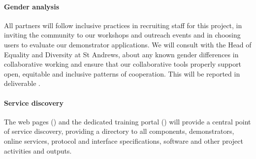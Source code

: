 \paragraph{Gender analysis}

All partners will follow inclusive practices in recruiting staff for this project, in
inviting the community to our workshops and outreach events and in choosing users to
evaluate our demonstrator applications. We will consult with the Head of Equality and
Diversity at St Andrews, about any known gender differences in collaborative working and
ensure that our collaborative tools properly support open, equitable and inclusive
patterns of cooperation. This will be reported in deliverable .

\paragraph{Service discovery}

The \TheProject web pages () and the
dedicated training portal () will
provide a central point of service discovery, providing a directory to
all components, demonstrators, online services, protocol and interface
specifications, software and other project activities and outputs.






